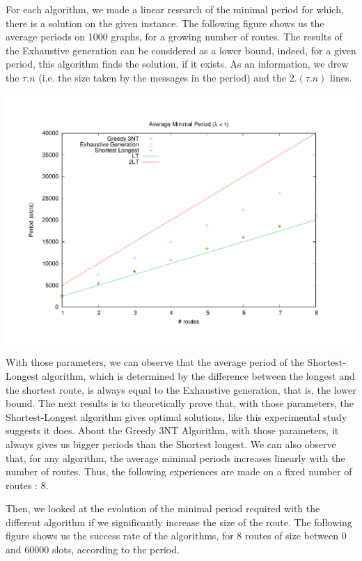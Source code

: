 \documentclass[a4paper,10pt]{article}
\begin{document}
      For each algorithm, we made a linear research of the minimal period for which, there is a solution on the given instance. The following figure shows us the average periods on 1000 graphs, for a growing number of routes.
      The results of the Exhaustive generation can be considered as a lower bound, indeed, for a given period, this algorithm finds the solution, if it exists.
      As an information, we drew the $\tau.n$ (i.e. the size taken by the messages in the period) and the $2.(\tau.n) $ lines.
      
      \begin{center}
      \includegraphics[scale=0.4]{periode_petite.pdf}
      \end{center}
     

      
     
      With those parameters, we can observe that the average period of the Shortest-Longest algorithm, which is determined by the difference between the longest and the shortest route, is always equal to the Exhaustive generation, that is, the lower bound.
      The next results is to theoretically prove that, with those parameters, the Shortest-Longest algorithm gives optimal solutions, like this experimental study suggests it does. 
      About the Greedy 3NT Algorithm, with those parameters, it always gives us bigger periods than the Shortest longest. 
      We can also observe that, for any algorithm, the average minimal periods increases linearly with the number of routes. Thus, the following experiences are made on a fixed number of routes : 8.
      
      Then, we looked at the evolution of the minimal period required with the different algorithm if we significantly increase the size of the route. The following figure shows us the success rate of the algorithms, for 8 routes of size between 0 and 60000 slots, according to the period.
      
\end{document}
